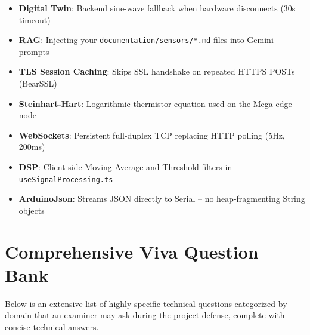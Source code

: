 \documentclass[12pt,a4paper]{article}
\newcommand{\keyword}[1]{\textcolor{keywordcolor}{\textbf{#1}}}
\begin{document}
\begin{tcolorbox}[keybox, title=\faLightbulb\; Key Concepts to Memorise]
\begin{itemize}[leftmargin=1.2em]
  \item \keyword{Digital Twin}: Backend sine-wave fallback when hardware disconnects (30s timeout)
  \item \keyword{RAG}: Injecting your \texttt{documentation/sensors/*.md} files into Gemini prompts
  \item \keyword{TLS Session Caching}: Skips SSL handshake on repeated HTTPS POSTs (BearSSL)
  \item \keyword{Steinhart-Hart}: Logarithmic thermistor equation used on the Mega edge node
  \item \keyword{WebSockets}: Persistent full-duplex TCP replacing HTTP polling (5Hz, 200ms)
  \item \keyword{DSP}: Client-side Moving Average and Threshold filters in \texttt{useSignalProcessing.ts}
  \item \keyword{ArduinoJson}: Streams JSON directly to Serial -- no heap-fragmenting String objects
\end{itemize}
\end{tcolorbox}
\vspace{0.3cm}
\section*{Comprehensive Viva Question Bank}

Below is an extensive list of highly specific technical questions categorized by domain that an examiner may ask during the project defense, complete with concise technical answers.
\end{document}
